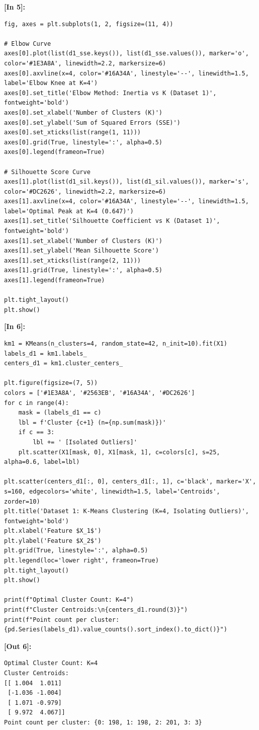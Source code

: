 \vspace{0.4em}
\noindent\textbf{\small [In 5]:}
\begin{lstlisting}[style=pycode]
fig, axes = plt.subplots(1, 2, figsize=(11, 4))

# Elbow Curve
axes[0].plot(list(d1_sse.keys()), list(d1_sse.values()), marker='o', color='#1E3A8A', linewidth=2.2, markersize=6)
axes[0].axvline(x=4, color='#16A34A', linestyle='--', linewidth=1.5, label='Elbow Knee at K=4')
axes[0].set_title('Elbow Method: Inertia vs K (Dataset 1)', fontweight='bold')
axes[0].set_xlabel('Number of Clusters (K)')
axes[0].set_ylabel('Sum of Squared Errors (SSE)')
axes[0].set_xticks(list(range(1, 11)))
axes[0].grid(True, linestyle=':', alpha=0.5)
axes[0].legend(frameon=True)

# Silhouette Score Curve
axes[1].plot(list(d1_sil.keys()), list(d1_sil.values()), marker='s', color='#DC2626', linewidth=2.2, markersize=6)
axes[1].axvline(x=4, color='#16A34A', linestyle='--', linewidth=1.5, label='Optimal Peak at K=4 (0.647)')
axes[1].set_title('Silhouette Coefficient vs K (Dataset 1)', fontweight='bold')
axes[1].set_xlabel('Number of Clusters (K)')
axes[1].set_ylabel('Mean Silhouette Score')
axes[1].set_xticks(list(range(2, 11)))
axes[1].grid(True, linestyle=':', alpha=0.5)
axes[1].legend(frameon=True)

plt.tight_layout()
plt.show()
\end{lstlisting}

\vspace{0.4em}
\noindent\textbf{\small [In 6]:}
\begin{lstlisting}[style=pycode]
km1 = KMeans(n_clusters=4, random_state=42, n_init=10).fit(X1)
labels_d1 = km1.labels_
centers_d1 = km1.cluster_centers_

plt.figure(figsize=(7, 5))
colors = ['#1E3A8A', '#2563EB', '#16A34A', '#DC2626']
for c in range(4):
    mask = (labels_d1 == c)
    lbl = f'Cluster {c+1} (n={np.sum(mask)})'
    if c == 3:
        lbl += ' [Isolated Outliers]'
    plt.scatter(X1[mask, 0], X1[mask, 1], c=colors[c], s=25, alpha=0.6, label=lbl)

plt.scatter(centers_d1[:, 0], centers_d1[:, 1], c='black', marker='X', s=160, edgecolors='white', linewidth=1.5, label='Centroids', zorder=10)
plt.title('Dataset 1: K-Means Clustering (K=4, Isolating Outliers)', fontweight='bold')
plt.xlabel('Feature $X_1$')
plt.ylabel('Feature $X_2$')
plt.grid(True, linestyle=':', alpha=0.5)
plt.legend(loc='lower right', frameon=True)
plt.tight_layout()
plt.show()

print(f"Optimal Cluster Count: K=4")
print(f"Cluster Centroids:\n{centers_d1.round(3)}")
print(f"Point count per cluster: {pd.Series(labels_d1).value_counts().sort_index().to_dict()}")
\end{lstlisting}
\noindent\textbf{\small [Out 6]:}
\begin{lstlisting}[style=output]
Optimal Cluster Count: K=4
Cluster Centroids:
[[ 1.004  1.011]
 [-1.036 -1.004]
 [ 1.071 -0.979]
 [ 9.972  4.067]]
Point count per cluster: {0: 198, 1: 198, 2: 201, 3: 3}
\end{lstlisting}

